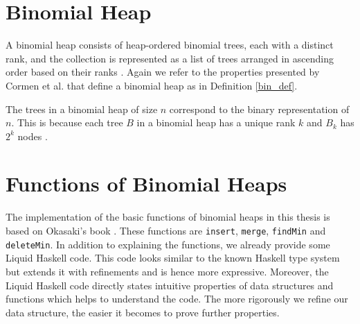 \documentclass{clmthesis}
\begin{document}
\section{Binomial Heap}\label{sec:biheap}
A binomial heap consists of heap-ordered binomial trees, each with a distinct rank, and the collection is represented as a list of trees arranged in ascending order based on their ranks \cite{okasaki1999}.
Again we refer to the properties presented by Cormen et al. \cite{thomas2022} that define a binomial heap as in Definition \ref{bin_def}.

The trees in a binomial heap of size $n$ correspond to the binary representation of $n$. This is because each tree $B$ in a binomial heap has a unique rank $k$ and $B_k$ has $2^k$ nodes \cite{okasaki1999}.



\section{Functions of Binomial Heaps}\label{bi_fun}
The implementation of the basic functions of binomial heaps in this thesis is based on Okasaki's book \cite{okasaki1999}. These functions are \texttt{insert}, \texttt{merge}, \texttt{findMin} and \texttt{deleteMin}. In addition to explaining the functions, we already provide some Liquid Haskell code. This code looks similar to the known Haskell type system but extends it with refinements and is hence more expressive. Moreover, the Liquid Haskell code directly states intuitive properties of data structures and functions which helps to understand the code. The more rigorously we refine our data structure, the easier it becomes to prove further properties.
\end{document}
